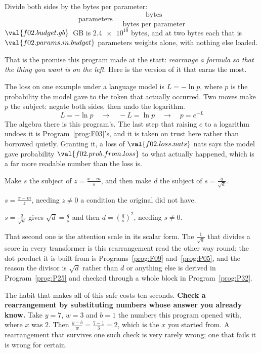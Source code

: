 \begin{fr}
\begin{ansblock}
Divide both sides by the bytes per parameter:
\[ \text{parameters} = \frac{\text{bytes}}{\text{bytes per parameter}} \]
$\val{f02.budget.gb}$~GB is $\num{2.4e10}$ bytes, and at two bytes each that is
$\val{f02.params.in.budget}$ parameters \dash{} weights alone, with nothing
else loaded.
\end{ansblock}

That is the promise this program made at the start: \emph{rearrange a formula
so that the thing you want is on the left}. Here is the version of it that
earns the most.

The loss on one example under a language model is $L = -\ln p$, where $p$ is
the probability the model gave to the token that actually occurred. Two moves
make $p$ the subject: negate both sides, then undo the logarithm.
\[ L = -\ln p \quad\longrightarrow\quad -L = \ln p
   \quad\longrightarrow\quad p = e^{-L} \]
The algebra there is this program's. The last step \dash{} that raising $e$ to
a logarithm undoes it \dash{} is Program~\ref{prog:F03}'s, and it is taken on
trust here rather than borrowed quietly. Granting it, a loss of
$\val{f02.loss.nats}$ nats says the model gave probability
$\val{f02.prob.from.loss}$ to what actually happened, which is a far more
readable number than the loss is.

\yourturn
Make $s$ the subject of $z = \frac{x - m}{s}$, and then make $d$ the subject
of $s = \frac{q}{\sqrt{d}}$.
\dotline
\nextframe
\end{fr}

\begin{fr}
\begin{ansblock}
$s = \frac{x - m}{z}$, needing $z \ne 0$ \dash{} a condition the original did
not have.

$s = \frac{q}{\sqrt{d}}$ gives $\sqrt{d} = \frac{q}{s}$ and then
$d = \left(\frac{q}{s}\right)^{2}$, needing $s \ne 0$.
\end{ansblock}

That second one is the attention scale in its scalar form. The
$\frac{1}{\sqrt{d}}$ that divides a score in every transformer is this
rearrangement read the other way round; the dot product it is built from is
Programs~\ref{prog:F09} and~\ref{prog:P05}, and the reason the divisor is
$\sqrt{d}$ rather than $d$ or anything else is derived in
Program~\ref{prog:P25} and checked through a whole block in
Program~\ref{prog:P32}.

\begin{note}
The habit that makes all of this safe costs ten seconds. \textbf{Check a
rearrangement by substituting numbers whose answer you already know.} Take
$y = 7$, $w = 3$ and $b = 1$ \dash{} the numbers this program opened with,
where $x$ was $2$. Then $\frac{y - b}{w} = \frac{7 - 1}{3} = 2$, which is the
$x$ you started from. A rearrangement that survives one such check is very
rarely wrong; one that fails it is wrong for certain.
\end{note}
\end{fr}

